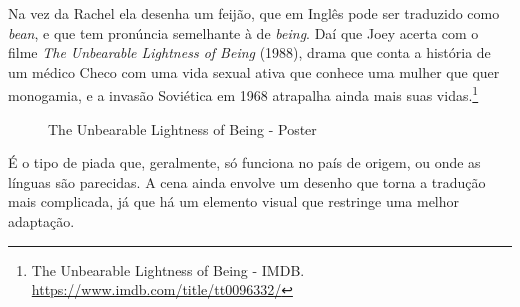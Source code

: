 \saveparinfos
\noindent
\begin{minipage}[c]{0.5\textwidth}\useparinfo

Na vez da Rachel ela desenha um feijão, que em Inglês pode ser traduzido
como \emph{bean}, e que tem pronúncia semelhante à de \emph{being}. Daí
que Joey acerta com o filme \emph{The Unbearable Lightness of Being}
(1988), drama que conta a história de um médico Checo com uma vida
sexual ativa que conhece uma mulher que quer monogamia, e a invasão
Soviética em 1968 atrapalha ainda mais suas vidas.\footnote{\sloppy The Unbearable Lightness of Being - IMDB. \url{https://www.imdb.com/title/tt0096332/}}

\end{minipage}\hfill
\begin{minipage}[c]{0.45\textwidth}

\begin{figure}
  \centering
    \caption{The Unbearable Lightness of Being - Poster\label{fig:the-unbearable-lightness-of-being-poster}}
\end{figure}

\end{minipage}

É o tipo de piada que, geralmente, só funciona no país de origem, ou
onde as línguas são parecidas. A cena ainda envolve um desenho que torna
a tradução mais complicada, já que há um elemento visual que restringe
uma melhor adaptação.
